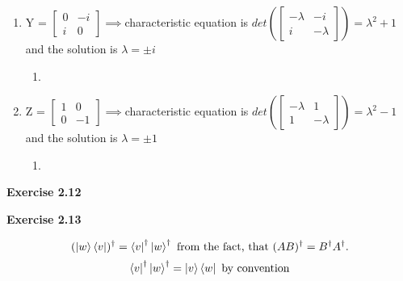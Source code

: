 \documentclass{article}
\begin{document}
\begin{framed}
\begin{enumerate}
\begin{enumerate}
        \end{enumerate}
        \item Y = $\begin{bmatrix} 0 & -i \\ i & 0 \end{bmatrix} \implies $characteristic equation is $det(\begin{bmatrix} - \lambda & -i \\ i & -\lambda \end{bmatrix}) = \lambda^2 + 1$ and the solution is $\lambda = \pm i$
        \begin{enumerate}
            \item 
        \end{enumerate}
        \item Z = $\begin{bmatrix} 1 & 0 \\ 0 & -1 \end{bmatrix} \implies $characteristic equation is $det(\begin{bmatrix} - \lambda & 1 \\ 1 & -\lambda \end{bmatrix}) = \lambda^2 - 1$ and the solution is $\lambda = \pm1$
        \begin{enumerate}
            \item 
        \end{enumerate}
    \end{enumerate}
    
    
\end{framed}

\bigskip

\begin{framed}
    \noindent \textbf{Exercise 2.12}
    
    \medskip
    
    
\end{framed}

\bigskip

\begin{framed}
    \noindent \textbf{Exercise 2.13}
    
    \medskip

    $$
    (\ket{w}\bra{v})^{\dagger} = \bra{v}^{\dagger}\ket{w}^{\dagger} \text{ from the fact, that } (AB)^{\dagger} = B^{\dagger}A^{\dagger}. 
    $$
    $$
        \bra{v}^{\dagger}\ket{w}^{\dagger} = \ket{v}\bra{w} \text{ by convention}
    $$
    
\end{framed}
\end{document}
